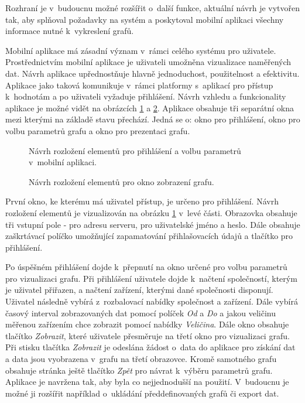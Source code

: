 Rozhraní je v~budoucnu možné rozšířit o~další funkce, aktuální návrh je vytvořen tak, aby splňoval požadavky na systém a poskytoval mobilní aplikaci všechny informace nutné k~vykreslení grafů.


\label{sec:mobile_app_design}
Mobilní aplikace má zásadní význam v~rámci celého systému pro uživatele. Prostřednictvím mobilní aplikace je uživateli umožněna vizualizace naměřených dat. 
Návrh aplikace upřednostňuje hlavně jednoduchost, použitelnost a efektivitu. Aplikace jako taková komunikuje v~rámci platformy s~aplikací pro přístup k~hodnotám a po uživateli vyžaduje přihlášení. 
Návrh vzhledu a funkcionality aplikace je možné vidět na obrázcích \ref{pic:app_design} a \ref{pic:graph_design}. 
Aplikace obsahuje tři separátní okna mezi kterými na základě stavu přechází. Jedná se o: okno pro přihlášení, okno pro volbu parametrů grafu a okno pro prezentaci grafu.

\begin{figure}[ht]
  \centering
  
  \caption{Návrh rozložení elementů pro přihlášení a volbu parametrů v~mobilní aplikaci.}
  \label{pic:app_design}
\end{figure}

\begin{figure}[!ht]
  \centering
  
  \caption{Návrh rozložení elementů pro okno zobrazení grafu.}
  \label{pic:graph_design}
\end{figure}

První okno, ke kterému má uživatel přístup, je určeno pro přihlášení. Návrh rozložení elementů je vizualizován na obrázku \ref{pic:app_design} v~levé části. Obrazovka obsahuje tři vstupní pole - pro adresu serveru, pro uživatelské jméno a heslo.
Dále obsahuje zaškrtávací políčko umožňující zapamatování přihlašovacích údajů a tlačítko pro přihlášení.

Po úspěšném přihlášení dojde k~přepnutí na okno určené pro volbu parametrů pro vizualizaci grafu. Při přihlášení uživatele dojde k~načtení společností, kterým je uživatel přiřazen, a načtení zařízení, kterými dané společnosti disponují. Uživatel následně vybírá z~rozbalovací nabídky společnost a zařízení. Dále vybírá časový interval zobrazovaných dat pomocí políček \textit{Od} a \textit{Do} a jakou veličinu měřenou zařízením chce zobrazit pomocí nabídky \textit{Veličina}. Dále okno obsahuje tlačítko \textit{Zobrazit}, které uživatele přesměruje na třetí okno pro vizualizaci grafu. Při stisku tlačítka \textit{Zobrazit} je odeslána žádost o~data do aplikace pro získání dat a data jsou vyobrazena v~grafu na třetí obrazovce. Kromě samotného grafu obsahuje stránka ještě tlačítko \textit{Zpět} pro návrat k~výběru parametrů grafu. 
Aplikace je navržena tak, aby byla co nejjednodušší na použití. V~budoucnu je možné ji rozšířit například o~ukládání předdefinovaných grafů či export dat.


